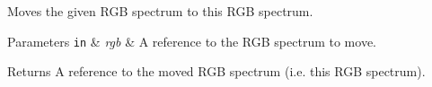 Moves the given R\+GB spectrum to this R\+GB spectrum.


\begin{DoxyParams}[1]{Parameters}
\mbox{\tt in}  & {\em rgb} & A reference to the R\+GB spectrum to move. \\
\hline
\end{DoxyParams}
\begin{DoxyReturn}{Returns}
A reference to the moved R\+GB spectrum (i.\+e. this R\+GB spectrum). 
\end{DoxyReturn}
